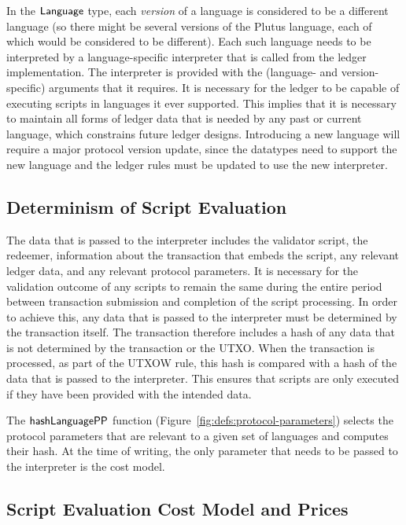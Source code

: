 In the $\mathsf{Language}$ type, each \emph{version} of a language is considered to be a different language (so there might be several versions of the Plutus language, each of which would be considered to
be different).
Each such language needs to be interpreted by a language-specific interpreter that is called from the ledger implementation.
The interpreter is provided with the (language- and version-specific) arguments that it requires.
It is necessary for the ledger to be capable of executing scripts in languages it ever supported.
This implies that it is necessary to maintain all forms of ledger
data that is needed by any past or current language, which constrains future ledger designs.
Introducing a new language will require a major protocol version update, since the datatypes need to support the new language and the ledger rules must be updated to use the new interpreter.

\subsection{Determinism of Script Evaluation}
\label{sec:determinism}

The data that is passed to the interpreter
includes the validator script, the redeemer, information about the transaction that
embeds the script, any relevant ledger data, and any relevant protocol parameters.
It is necessary for the validation outcome of any scripts to remain the same during the entire
period between transaction
submission and completion of the script processing.
%
In order to achieve this,
any data that is passed to the interpreter must be determined by the transaction itself.
The transaction therefore includes a hash of any data that is not determined by the transaction or the UTXO.
When the transaction is processed, as part of the UTXOW rule, this hash is compared with a hash of the data that is passed to the interpreter. This
ensures that scripts are only executed if they have been provided with the intended data.

The $\mathsf{hashLanguagePP}$ function (Figure~\ref{fig:defs:protocol-parameters}) selects the protocol parameters that are relevant to
a given set of languages and computes their hash.
%
At the time of writing, the only parameter that needs to be passed to the interpreter is the cost model.

\subsection{Script Evaluation Cost Model and Prices}
\label{sec:cost-mod}

